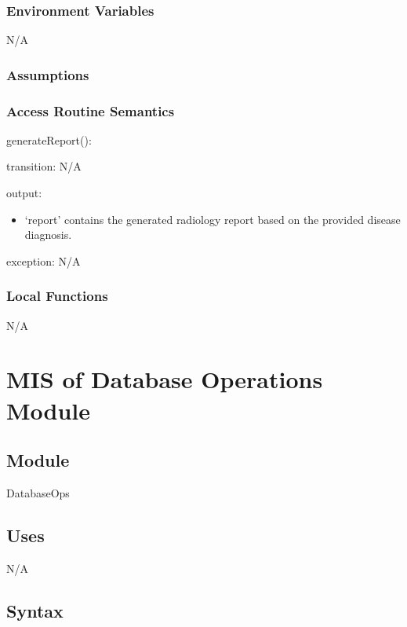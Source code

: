 \documentclass[12pt, titlepage]{article}
\begin{document}
\subsubsection{Environment Variables}
N/A

\subsubsection{Assumptions}

\subsubsection{Access Routine Semantics}

\noindent generateReport():
\begin{itemize}
  \begin{item}
    transition: N/A
  \end{item}
  \begin{item}
    output:
    \begin{itemize}
      \item `report' contains the generated radiology report based on the
        provided disease diagnosis.
    \end{itemize}
  \end{item}
  \begin{item}
    exception: N/A
  \end{item}
\end{itemize}

\subsubsection{Local Functions}
N/A

\newpage

\section{MIS of Database Operations Module} \label{mDatabaseOps}

\subsection{Module}
DatabaseOps

\subsection{Uses}
N/A

\subsection{Syntax}
\end{document}
